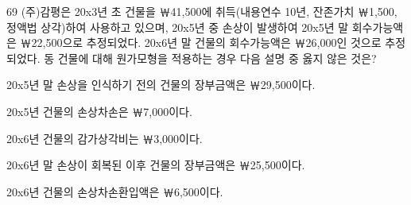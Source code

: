 \begin{question}{69}
(주)감평은 20x3년 초 건물을 ￦41,500에 취득(내용연수 10년, 잔존가치 ￦1,500, 정액법 상각)하여 사용하고 있으며, 20x5년 중 손상이 발생하여 20x5년 말 회수가능액은 ￦22,500으로 추정되었다. 20x6년 말 건물의 회수가능액은 ￦26,000인 것으로 추정되었다. 동 건물에 대해 원가모형을 적용하는 경우 다음 설명 중 옳지 않은 것은?
\begin{choices}
  \item 20x5년 말 손상을 인식하기 전의 건물의 장부금액은 ￦29,500이다.
  \item 20x5년 건물의 손상차손은 ￦7,000이다.
  \item 20x6년 건물의 감가상각비는 ￦3,000이다.
  \item 20x6년 말 손상이 회복된 이후 건물의 장부금액은 ￦25,500이다.
  \item 20x6년 건물의 손상차손환입액은 ￦6,500이다.
\end{choices}
\end{question}
